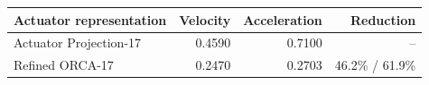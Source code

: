 \begin{tabular}{lrrr}
\toprule
Actuator representation & Velocity & Acceleration & Reduction \\
\midrule
Actuator Projection-17 & 0.4590 & 0.7100 & -- \\
Refined ORCA-17 & 0.2470 & 0.2703 & 46.2\% / 61.9\% \\
\bottomrule
\end{tabular}
